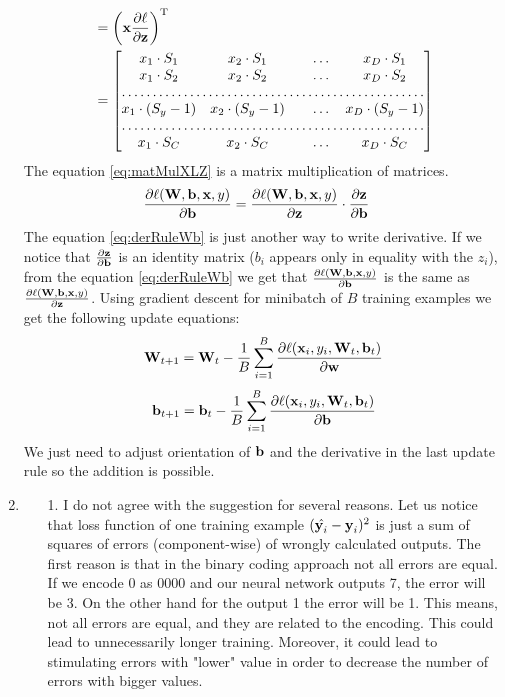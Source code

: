 \documentclass[10pt,a4paper]{article}
\begin{document}
\begin{enumerate}
\begin{align}
&=\transpose{\left( \vect{x} \frac{\partial \ell}{\partial \vect{z}}\right)} \nonumber \\
&=\begin{bmatrix}
    x_1 \cdot S_1   & 
x_2 \cdot S_1      &  & \dots  & x_D\cdot S_1 \\
 x_1 \cdot S_2    & 
x_2 \cdot S_2 &  & \dots & x_D \cdot S_2 \\
    \hdotsfor{5} \\
     x_1 \cdot (S_y -1)    & 
x_2 \cdot (S_y -1) &  & \dots & x_D \cdot (S_y -1) \\
    \hdotsfor{5} \\
        x_1 \cdot S_C    & 
x_2 \cdot S_C &     &  \dots& x_D \cdot  S_C \\
\end{bmatrix}\label{eq:matMulXLZ}
\end{align}
The equation \ref{eq:matMulXLZ} is a matrix multiplication of matrices. 
\begin{align}
\frac{\partial \ell(\textbf{\text{{W}}}, \textbf{\text{{b}}}, \textbf{\text{{x}}}, y)}{\partial \textbf{\text{{b}}}} &=
\frac{\partial \ell (\textbf{\text{{W}}}, \textbf{\text{{b}}}, \textbf{\text{{x}}}, y)}{\partial \textbf{\text{{z}}}}
\cdot \frac{\partial \textbf{\text{{z}}}}{\partial \textbf{\text{{b}}}} \label{eq:derRuleWb}
\end{align}
The equation \ref{eq:derRuleWb} is just another way to write derivative. 
If we notice that $\frac{\partial \textbf{\text{{z}}}}{\partial \textbf{\text{{b}}}}$ is an identity matrix ($b_i$ appears only in equality with the $z_i$), from the equation \ref{eq:derRuleWb} we get that $\frac{\partial \ell(\textbf{\text{{W}}}, \textbf{\text{{b}}}, \textbf{\text{{x}}}, y)}{\partial \textbf{\text{{b}}}}$ is the same as $\frac{\partial \ell(\textbf{\text{{W}}}, \textbf{\text{{b}}}, \textbf{\text{{x}}}, y)}{\partial \textbf{\text{{z}}}}$.
Using gradient descent for minibatch of $B$ training examples we get the following update equations:
$$\textbf{\text{{W}}}_{t+1} = \textbf{\text{{W}}}_t - \frac{1}{B}\sum_{i=1}^B\frac{\partial \ell(\textbf{\text{{x}}}_i, y_i, \textbf{\text{{W}}}_t, \textbf{\text{{b}}}_t)}{\partial \textbf{\text{{w}}}}$$
$$\textbf{\text{{b}}}_{t+1} = \textbf{\text{{b}}}_t - \frac{1}{B}\sum_{i=1}^B\frac{\partial \ell(\textbf{\text{{x}}}_i, y_i, \textbf{\text{{W}}}_t, \textbf{\text{{b}}}_t)}{\partial \textbf{\text{{b}}}}$$
We just need to adjust orientation of $\textbf{\text{{b}}}$ and the derivative in the last update rule so the addition is possible. 
\item 
\begin{enumerate}
\item [1.]
I do not agree with the suggestion for several reasons. Let us notice that loss function of one training example $(\hat{\textbf{\text{{y}}}_i}-\textbf{\text{{y}}}_i)^2$ is just a sum of squares of errors (component-wise) of wrongly calculated outputs. The first reason is that in the binary coding approach not all errors are equal. If we encode 0 as 0000 and our neural network outputs 7, the error will be 3. On the other hand for the output 1 the error will be 1. This means, not all errors are equal, and they are related to the encoding. This could lead to unnecessarily longer training. Moreover, it could lead to stimulating errors with "lower" value in order to decrease the number of errors with bigger values.\\

\end{enumerate}
\end{enumerate}
\end{document}
